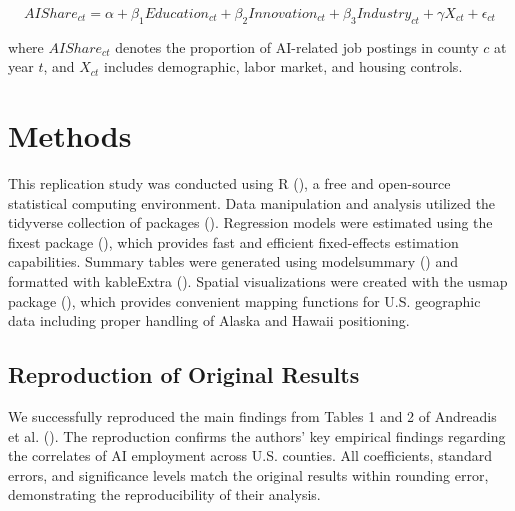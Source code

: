\documentclass[
]{article}
\begin{document}
\[
AIShare_{ct} = \alpha + \beta_1 Education_{ct} + \beta_2 Innovation_{ct} + \beta_3 Industry_{ct} + \gamma X_{ct} + \epsilon_{ct} \tag{2}
\]

where \(AIShare_{ct}\) denotes the proportion of AI-related job postings
in county \(c\) at year \(t\), and \(X_{ct}\) includes demographic,
labor market, and housing controls.

\section{Methods}\label{methods}

This replication study was conducted using R (), a free and open-source statistical computing
environment. Data manipulation and analysis utilized the tidyverse
collection of packages ().
Regression models were estimated using the fixest package
(), which provides fast and efficient
fixed-effects estimation capabilities. Summary tables were generated
using modelsummary () and
formatted with kableExtra ().
Spatial visualizations were created with the usmap package
(), which provides convenient
mapping functions for U.S. geographic data including proper handling of
Alaska and Hawaii positioning.

\subsection{Reproduction of Original
Results}\label{reproduction-of-original-results}

We successfully reproduced the main findings from Tables 1 and 2 of
Andreadis et al. (). The reproduction
confirms the authors' key empirical findings regarding the correlates of
AI employment across U.S. counties. All coefficients, standard errors,
and significance levels match the original results within rounding
error, demonstrating the reproducibility of their analysis.
\end{document}
